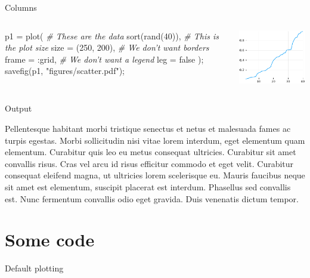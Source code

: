 \documentclass[11pt, compress, aspectratio=1610, serif]{beamer}
\newenvironment{Shaded}{}{}
\newcommand{\FloatTok}[1]{\textcolor[rgb]{0.25,0.63,0.44}{{#1}}}
\newcommand{\StringTok}[1]{\textcolor[rgb]{0.25,0.44,0.63}{{#1}}}
\newcommand{\CommentTok}[1]{\textcolor[rgb]{0.38,0.63,0.69}{\textit{{#1}}}}
\newcommand{\NormalTok}[1]{{#1}}
\newcommand{\begincols}{\begin{columns}}
\newcommand{\stopcols}{\end{columns}}
\begin{document}
\begin{frame}[fragile]{Columns}

\begincols
{}

\begin{Shaded}
\begin{Highlighting}[]
\NormalTok{p1 = plot(}
  \CommentTok{# These are the data}
  \NormalTok{sort(rand(}\FloatTok{40}\NormalTok{)),}
  \CommentTok{# This is the plot size}
  \NormalTok{size  = (}\FloatTok{250}\NormalTok{, }\FloatTok{200}\NormalTok{),}
  \CommentTok{# We don't want borders}
  \NormalTok{frame = :grid,}
  \CommentTok{# We don't want a legend}
  \NormalTok{leg   = false}
  \NormalTok{);}
\NormalTok{savefig(p1, }\StringTok{"figures/scatter.pdf"}\NormalTok{);}
\end{Highlighting}
\end{Shaded}

\hfill{}

\includegraphics[width=\columnwidth]{figures/scatter.pdf}

\stopcols

\end{frame}

\begin{frame}{Output}

Pellentesque habitant morbi tristique senectus et netus et malesuada
fames ac turpis egestas. Morbi sollicitudin nisi vitae lorem interdum,
eget elementum quam elementum. Curabitur quis leo eu metus consequat
ultricies. Curabitur sit amet convallis risus. Cras vel arcu id risus
efficitur commodo et eget velit. Curabitur consequat eleifend magna, ut
ultricies lorem scelerisque eu. Mauris faucibus neque sit amet est
elementum, suscipit placerat est interdum. Phasellus sed convallis est.
Nunc fermentum convallis odio eget gravida. Duis venenatis dictum
tempor.

\end{frame}

\section{Some code}\label{some-code}

\begin{frame}{Default plotting}

\end{frame}
\end{document}
